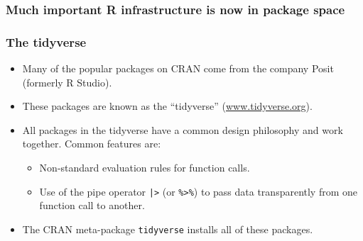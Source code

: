 \documentclass[svgnames, aspectratio=169]{beamer}
\begin{document}
\begin{frame}
  \frametitle{Much important R infrastructure is now in package space}

  \begin{center}
  \end{center}
    
\end{frame}

\begin{frame}[fragile]
  \frametitle{The tidyverse}
  
  \begin{itemize}
  \item Many of the popular packages on CRAN come from the company
    Posit (formerly R Studio).
  \item These packages are known as the ``tidyverse''
    (\url{www.tidyverse.org}).
  \item All packages in the tidyverse have a common design philosophy
    and work together. Common features are:
    \begin{itemize}
    \item Non-standard evaluation rules for function calls.
    \item Use of the pipe operator \verb+|>+ (or \verb+%>%+) to pass
      data transparently from one function call to another.
    \end{itemize}
  \item The CRAN meta-package \texttt{tidyverse} installs all of these
    packages.
  \end{itemize}
  
\end{frame}
\end{document}
